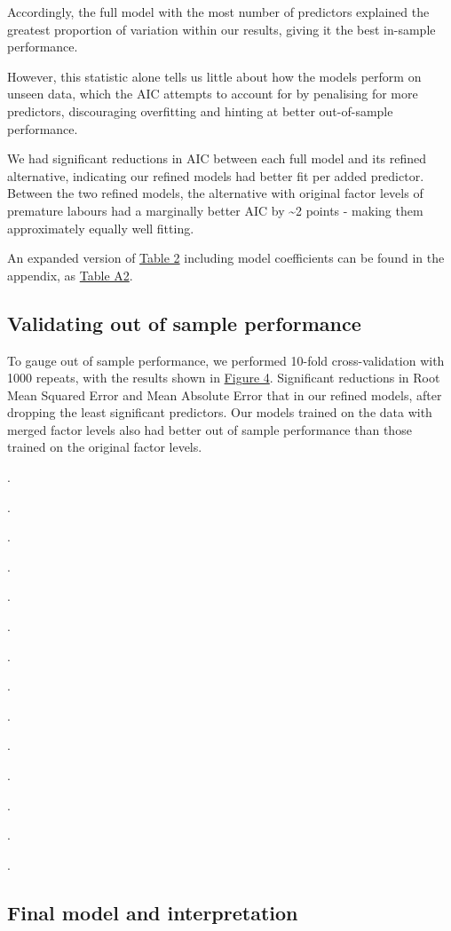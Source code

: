 \documentclass[letterpaper,9pt,twocolumn,twoside,]{pinp}
\begin{document}
Accordingly, the full model with the most number of predictors explained
the greatest proportion of variation within our results, giving it the
best in-sample performance.

However, this statistic alone tells us little about how the models
perform on unseen data, which the AIC attempts to account for by
penalising for more predictors, discouraging overfitting and hinting at
better out-of-sample performance.

We had significant reductions in AIC between each full model and its
refined alternative, indicating our refined models had better fit per
added predictor. Between the two refined models, the alternative with
original factor levels of premature labours had a marginally better AIC
by \textasciitilde2 points - making them approximately equally well
fitting.

An expanded version of \href{tb2}{Table 2} including model coefficients
can be found in the appendix, as \href{tba2}{Table A2}.

\subsection{Validating out of sample
performance}\label{validating-out-of-sample-performance}

To gauge out of sample performance, we performed 10-fold
cross-validation with 1000 repeats, with the results shown in
\href{fig4}{Figure 4}. Significant reductions in Root Mean Squared Error
and Mean Absolute Error that in our refined models, after dropping the
least significant predictors. Our models trained on the data with merged
factor levels also had better out of sample performance than those
trained on the original factor levels.

.

.

.

.

.

.

.

.

.

.

.

.

.

.

\subsection{Final model and
interpretation}\label{final-model-and-interpretation}
\end{document}
